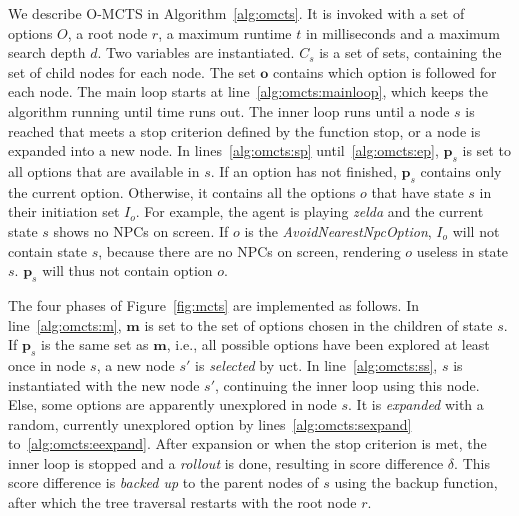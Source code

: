 We describe O-MCTS in Algorithm~\ref{alg:omcts}. It is invoked with a set of
options $O$, a root node $r$, a maximum runtime $t$ in milliseconds and a
maximum search depth $d$. Two variables are instantiated. $C_s$ is a set of
sets, containing the set of child nodes for each node. The set $\mathbf{o}$
contains which option is followed for each node. The main loop starts at 
line~\ref{alg:omcts:mainloop}, which keeps the algorithm running until time runs out.
The inner loop runs until a node $s$ is reached that meets a stop criterion
defined by the function \textsf{stop}, or a node is expanded into a new node.
In lines~\ref{alg:omcts:sp} until~\ref{alg:omcts:ep}, $\mathbf{p}_s$ is set to
all options that are available in $s$. If an option has not finished,
$\mathbf{p}_s$ contains only the current option. Otherwise, it contains all the
options $o$ that have state $s$ in their initiation set $I_o$. For example, the
agent is playing \textit{zelda} and the current state $s$ shows no NPCs on
screen. If $o$ is the \textit{AvoidNearestNpcOption}, $I_o$ will not contain
state $s$, because there are no NPCs on screen, rendering $o$ useless in state
$s$. $\mathbf{p}_s$ will thus not contain option $o$.

The four phases of Figure~\ref{fig:mcts} are implemented as follows.  In 
line~\ref{alg:omcts:m}, $\mathbf{m}$ is set to the set of options chosen in the
children of state $s$. If $\mathbf{p}_s$ is the same set as $\mathbf{m}$, i.e.,
all possible options have been explored at least once in node $s$, a new node
$s'$ is \emph{selected} by \textsf{uct}. In line~\ref{alg:omcts:ss}, $s$ is
instantiated with the new node $s'$, continuing the inner loop using this node.
Else, some options are apparently unexplored in node $s$. It is \emph{expanded}
with a random, currently unexplored option by lines~\ref{alg:omcts:sexpand}
to~\ref{alg:omcts:eexpand}. After expansion or when the stop criterion is met,
the inner loop is stopped and a \emph{rollout} is done, resulting in
score difference $\delta$. This score difference is \emph{backed up} to the
parent nodes of $s$ using the backup function, after which the tree traversal
restarts with the root node $r$.

